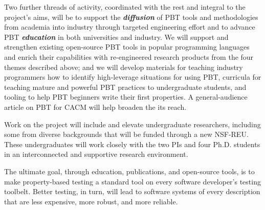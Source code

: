 
Two further threads of activity, coordinated with the rest and integral to the
project's aims, will
%
be to support the {\bf\em diffusion} of PBT tools and
methodologies from academia into industry through targeted engineering effort
%
and to advance PBT {\bf\em education} in
both universities and industry.  We will support and strengthen existing
open-source PBT tools in popular programming languages and enrich their
capabilities with re-engineered research products from the four themes described
above;
%
and we will
develop materials for teaching industry programmers how to identify
high-leverage situations for using PBT, curricula for teaching mature
and powerful PBT practices to undergraduate students, and tooling to help
PBT beginners write their first properties.
%
A general-audience article on PBT for CACM will help broaden the
its reach.\iflater{}\fi

Work on the project will include and elevate undergraduate
researchers, including some from diverse backgrounds that will be
funded through a new NSF-REU. These undergraduates will work
closely with the two PIs and four Ph.D.{} students in an interconnected and supportive
research environment.

The ultimate goal, through education, publications, and open-source
tools, is to make property-based testing a standard tool on every
software developer's testing toolbelt.  Better testing, in turn, will
lead to software systems of every description that are less expensive, more
robust, and more reliable.


